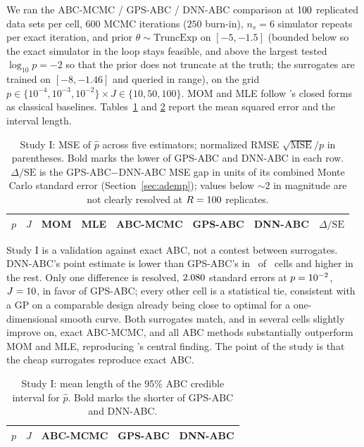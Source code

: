 \documentclass[sn-basic,iicol,pdflatex]{sn-jnl}
\begin{document}
We ran the ABC-MCMC / GPS-ABC / DNN-ABC comparison at $100$ replicated data sets
per cell, $600$ MCMC iterations ($250$ burn-in), $n_s=6$ simulator repeats per
exact iteration, and prior $\theta \sim \mathrm{TruncExp}$ on $[-5,-1.5]$ (bounded
below so the exact simulator in the loop stays feasible, and above the largest tested $\log_{10}p=-2$ so that the prior does not truncate at the truth; the surrogates are trained on
$[-8,-1.46]$ and queried in range), on the grid $p \in \{10^{-4}, 10^{-3},
10^{-2}\} \times J \in \{10, 50, 100\}$. MOM and MLE follow \citeauthor{lu2023}'s
closed forms as classical baselines. Tables~\ref{tab:mse1D} and \ref{tab:ci1D} report the mean squared error and the interval length.


\begin{table}[t]
\centering
\caption{Study I: MSE of $\hat p$ across five estimators; normalized
RMSE $\sqrt{\mathrm{MSE}}/p$ in parentheses. Bold marks the lower of GPS-ABC
and DNN-ABC in each row. $\Delta/\mathrm{SE}$ is the GPS-ABC$-$DNN-ABC MSE gap
in units of its combined Monte Carlo standard error (Section~\ref{sec:ademp});
values below $\sim 2$ in magnitude are not clearly resolved at $R=100$
replicates.}
\label{tab:mse1D}
{\small
\begin{tabular}{rrrrrrrr}
\toprule
$p$ & $J$ & MOM & MLE & ABC-MCMC & GPS-ABC & DNN-ABC & $\Delta/\mathrm{SE}$ \\
\midrule

\end{tabular}}
\end{table}

Study I is a validation against exact ABC, not a contest between surrogates. DNN-ABC's point estimate is lower than GPS-ABC's in \soneNDnnMseLower\ of \soneNCells\ cells and higher in the rest.
Only one difference is resolved, $2.080$ standard errors at $p=10^{-2}$, $J=10$, in favor of GPS-ABC; every other cell is a statistical tie, consistent with a GP on a comparable
design already being close to optimal for a one-dimensional smooth curve. Both surrogates match, and in several cells slightly improve on, exact ABC-MCMC, and all ABC methods substantially outperform
MOM and MLE, reproducing \citeauthor{lu2023}'s central finding. The point of the study is that the cheap surrogates reproduce exact ABC.


\begin{table}[t]
\centering
\caption{Study I: mean length of the 95\% ABC credible interval for
$\hat p$. Bold marks the shorter of GPS-ABC and DNN-ABC.}
\label{tab:ci1D}
\begin{tabular}{rrrrr}
\toprule
$p$ & $J$ & ABC-MCMC & GPS-ABC & DNN-ABC \\
\midrule

\end{tabular}
\end{table}
\end{document}
